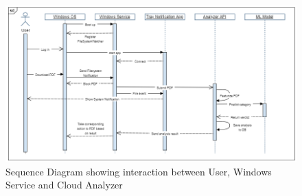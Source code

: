 \begin{figure}[H]
	\centerline{\includegraphics[scale=0.55]{figures/sequence.png}}  
	\caption{Sequence Diagram showing interaction between User, Windows Service and Cloud Analyzer}
	\label{sequence}
\end{figure}


